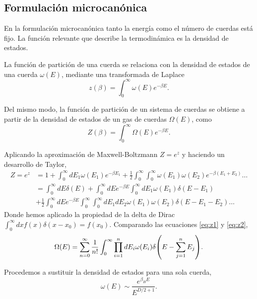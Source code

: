 \subsection{Formulación microcanónica}

En la formulación microcanónica tanto la energía como el número de cuerdas está fijo.
La función relevante que describe la termodinámica es la densidad de estados. 

La función de partición de una cuerda se relaciona con la densidad de estados de una cuerda $\omega(E)$, mediante
una transformada de Laplace
\begin{equation}
  z(\beta) = \int_0^\infty \omega(E)e^{-\beta E}.
\end{equation}

Del mismo modo, la función de partición de un sistema de cuerdas se obtiene a partir de la
densidad de estados de un gas de cuerdas $\Omega(E)$, como
\begin{equation}
  Z(\beta) = \int_0^\infty \Omega(E)e^{-\beta E}.
  \label{eq:z1}
\end{equation}

Aplicando la aproximación de Maxwell-Boltzmann $Z=e^z$ y haciendo un desarrollo de Taylor,
\begin{equation}
  \begin{aligned}
      Z = e^z&= 1+ \int_0^\infty dE_1\omega(E_1)e^{-\beta E_1} +\frac 1 2 \int_0^\infty \int_0^\infty
      \omega(E_1)\omega(E_2)e^{-\beta(E_1+E_2)}\dots \\
      &=\int_0^\infty dE \delta(E) + \int_0^\infty dE e^{-\beta E}\int_0^\infty  dE_1\omega(E_1)\delta(E-E_1)\\
      &+\frac 1 2\int_0^\infty dE e^{-\beta E} \int_0^\infty\int_0^\infty dE_1 dE_2 \omega(E_1)\omega(E_2) \delta(E-E_1-E_2)\dots
  \end{aligned}
  \label{eq:z2}
\end{equation}
Donde hemos aplicado la propiedad de la delta de Dirac $\int_0^\infty dx f(x)\delta(x-x_0) = f(x_0)$.
Comparando las ecuaciones \ref{eq:z1} y \ref{eq:z2},
\begin{equation}
  \Omega(E)=\sum_{n=0}^\infty \frac{1}{n!}\int_0^\infty \prod_{i=1}^n dE_i \omega(E_i)\delta\qty(E-\sum_{j=1}^n E_j).
\end{equation}

Procedemos a sustituir la densidad de estados para una sola cuerda,
\begin{equation}
  \omega(E)\sim \frac{e^{\beta_H E}}{E^{D/2+1}}.
  \label{eq:dd}
\end{equation}

